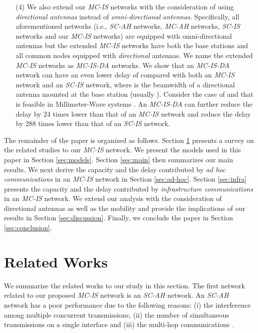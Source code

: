 \documentclass[10pt,journal]{IEEEtran}
\begin{document}
\begin{enumerate}
	\item[(4)] We also extend our \emph{MC-IS} networks with the consideration of using \emph{directional antennas} instead of \emph{omni-directional antennas}. Specifically, all aforementioned networks (i.e., \emph{SC-AH} networks, \emph{MC-AH} networks, \emph{SC-IS} networks and our \emph{MC-IS} networks) are equipped with omni-directional antennas but the extended \emph{MC-IS} networks have both the base stations and all common nodes equipped with \emph{directional} antennas. We name the extended \emph{MC-IS} networks as \emph{MC-IS-DA} networks. We show that an \emph{MC-IS-DA} network can have an even lower delay of  compared with both an \emph{MC-IS} network and an \textit{SC-IS} network, where  is the beamwidth of a directional antenna mounted at the base station (usually ). Consider the case of  and  that is feasible in Millimeter-Wave systems \cite{Rappaport:icc15}. An \emph{MC-IS-DA} can further reduce the delay by 24 times lower than that of an \emph{MC-IS} network and reduce the delay by 288 times lower than that of an \emph{SC-IS} network.
\end{enumerate}

The remainder of the paper is organized as follows. Section \ref{sec:related} presents a survey on the related studies to our \textit{MC-IS} network. We present the models used in this paper in Section \ref{sec:models}. Section \ref{sec:main} then summarizes our main results. We next derive the capacity and the delay contributed by \textit{ad hoc communications} in an \textit{MC-IS} network in Section \ref{sec:ad-hoc}. Section \ref{sec:infra} presents the capacity and the delay contributed by \textit{infrastructure communications} in an \textit{MC-IS} network. We extend our analysis with the consideration of directional antennas as well as the mobility and provide the implications of our results in Section \ref{sec:discussion}. Finally, we conclude the paper in Section \ref{sec:conclusion}.

\section{Related Works}
\label{sec:related}

We summarize the related works to our study in this section. The first network related to our proposed \textit{MC-IS} network is an \textit{SC-AH} network. An \textit{SC-AH} network has a poor performance due to the following reasons: (i) the interference among multiple concurrent transmissions, (ii) the number of simultaneous transmissions on a single interface and (iii) the multi-hop communications \cite{Gupta:Kumar,gamal:2004,gamal:TIT2006}.
\end{document}
